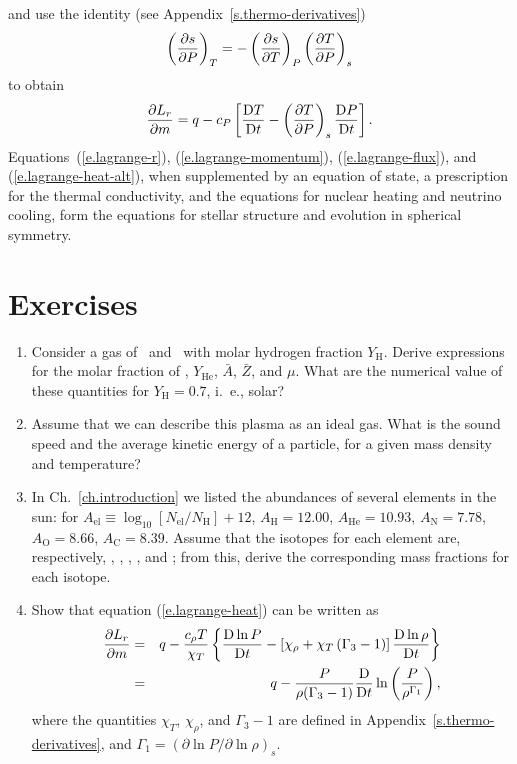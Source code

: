 and use the identity (see Appendix~\ref{s.thermo-derivatives})
\[
	\left(\frac{\partial s}{\partial P}\right)_{T} = -\left(\frac{\partial s}{\partial T}\right)_{P}\left(\frac{\partial T}{\partial P}\right)_{s}
\]
to obtain
\begin{equation}\label{e.lagrange-heat-alt}
	\frac{\partial L_{r}}{\partial m} 
	= q - c_{P}\left[ \frac{\mathrm{D} T}{\mathrm{D} t} - \left(\frac{\partial T}{\partial P}\right)_{s} \frac{\mathrm{D} P}{\mathrm{D} t}\right].
\end{equation}
Equations~(\ref{e.lagrange-r}), (\ref{e.lagrange-momentum}), (\ref{e.lagrange-flux}), and (\ref{e.lagrange-heat-alt}), when supplemented by an equation of state, a prescription for the thermal conductivity, and the equations for nuclear heating and neutrino cooling, form the equations for stellar structure and evolution in spherical symmetry. 

\section{Exercises}
\begin{enumerate}
\item Consider a gas of \hydrogen\ and \helium\ with molar hydrogen fraction $Y_{\mathrm{H}}$.  Derive expressions for the molar fraction of \helium, $Y_{\mathrm{He}}$, $\bar{A}$, $\bar{Z}$, and $\mu$. What are the numerical value of these quantities for $Y_{\mathrm{H}} = 0.7$, i.~e., solar?

\item Assume that we can describe this plasma as an ideal gas.  What is the sound speed and the average kinetic energy of a particle, for a given mass density and temperature?

\item In Ch.~\ref{ch.introduction} we listed the abundances of several elements in the sun: for $A_{\mathrm{el}} \equiv \log_{10}[N_{\mathrm{el}}/N_{\mathrm{H}}]+12$, $A_{\mathrm{H}} = 12.00$, $A_{\mathrm{He}} = 10.93$, $A_{\mathrm{N}}=7.78$, $A_{\mathrm{O}}=8.66$, $A_{\mathrm{C}} = 8.39$.  Assume that the isotopes for each element are, respectively, \hydrogen, \helium, \nitrogen, \oxygen, and \carbon; from this, derive the corresponding mass fractions for each isotope.

\item Show that equation (\ref{e.lagrange-heat}) can be written as
\begin{eqnarray}
\frac{\partial L_{r}}{\partial m} &=& q - \frac{c_{\rho} T}{\chi_{T}}\left\{\frac{\mathrm{D}\ln P}{\mathrm{D} t} - \left[\chi_{\rho} + \chi_{T}\left(\Gamma_{3} - 1\right)\right]\frac{\mathrm{D}\ln \rho}{\mathrm{D} t}\right\}\\
 &=& q - \frac{P}{\rho(\Gamma_{3}-1)}\frac{\mathrm{D} }{\mathrm{D} t}\ln\left(\frac{P}{\rho^{\Gamma_{1}}}\right),
\label{e.lagrange-heat-alt2}
\end{eqnarray}
where the quantities $\chi_{T}$, $\chi_{\rho}$, and $\Gamma_{3}-1$ are defined in Appendix~\ref{s.thermo-derivatives}, and $\Gamma_{1} = (\partial \ln P/\partial\ln \rho)_{s}$. 
\end{enumerate}


